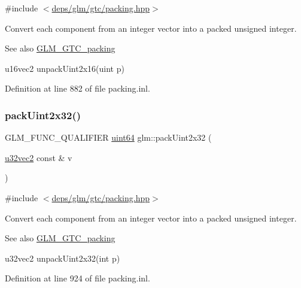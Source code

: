 {\ttfamily \#include $<$\hyperlink{gtc_2packing_8hpp}{deps/glm/gtc/packing.\+hpp}$>$}

Convert each component from an integer vector into a packed unsigned integer.

\begin{DoxySeeAlso}{See also}
\hyperlink{group__gtc__packing}{G\+L\+M\+\_\+\+G\+T\+C\+\_\+packing} 

u16vec2 unpack\+Uint2x16(uint p) 
\end{DoxySeeAlso}


Definition at line 882 of file packing.\+inl.

\mbox{\label{group__gtc__packing_ga4c4e4d6ab81a6b14cf066b40b6967c0a}} 
\subsubsection{\texorpdfstring{pack\+Uint2x32()}{packUint2x32()}}
{\footnotesize\ttfamily G\+L\+M\+\_\+\+F\+U\+N\+C\+\_\+\+Q\+U\+A\+L\+I\+F\+I\+ER \hyperlink{group__gtc__type__precision_gae3632bf9b37da66233d78930dd06378a}{uint64} glm\+::pack\+Uint2x32 (\begin{DoxyParamCaption}\item[{\hyperlink{group__gtc__type__precision_gad854a1005ce84d8f6e8f05e42893f5c9}{u32vec2} const \&}]{v }\end{DoxyParamCaption})}



{\ttfamily \#include $<$\hyperlink{gtc_2packing_8hpp}{deps/glm/gtc/packing.\+hpp}$>$}

Convert each component from an integer vector into a packed unsigned integer.

\begin{DoxySeeAlso}{See also}
\hyperlink{group__gtc__packing}{G\+L\+M\+\_\+\+G\+T\+C\+\_\+packing} 

u32vec2 unpack\+Uint2x32(int p) 
\end{DoxySeeAlso}


Definition at line 924 of file packing.\+inl.

\mbox{\label{group__gtc__packing_ga4a431a30aa5dfb425be3ea84fe561844}} 
